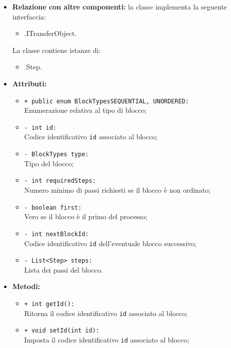 \begin{flushleft}
\begin{itemize}
\item \textbf{Relazione con altre componenti:} la classe implementa la seguente interfaccia:
		\begin{itemize}
			\item \smodel{}.ITransferObject.
		\end{itemize}
		La classe contiene istanze di:
		\begin{itemize}
			\item \smodel{}.Step.
		\end{itemize}
\item \textbf{Attributi:}
\begin{sloppypar}
\begin{itemize}
\item \texttt{+ public enum BlockTypes{SEQUENTIAL, UNORDERED}:}\\ Enumerazione relativa al tipo di blocco;
\item \texttt{- int id:}\\ Codice identificativo \texttt{id} associato al blocco;
\item \texttt{- BlockTypes type:}\\ Tipo del blocco;
\item \texttt{- int requiredSteps:}\\ Numero minimo di passi richiesti se il blocco è non ordinato;
\item \texttt{- boolean first:}\\ Vero se il blocco è il primo del processo;
\item \texttt{- int nextBlockId:}\\ Codice identificativo \texttt{id} dell'eventuale blocco successivo;
\item \texttt{- List<Step> steps:}\\ Lista dei passi del blocco.
\end{itemize}
\end{sloppypar}
\item \textbf{Metodi:}
\begin{sloppypar}
\begin{itemize}
\item \texttt{+ int getId():}\\ Ritorna il codice identificativo \texttt{id} associato al blocco;
\item \texttt{+ void setId(int id):}\\ Imposta il codice identificativo \texttt{id} associato al blocco;

\end{itemize}
\end{sloppypar}
\end{itemize}
\end{flushleft}
